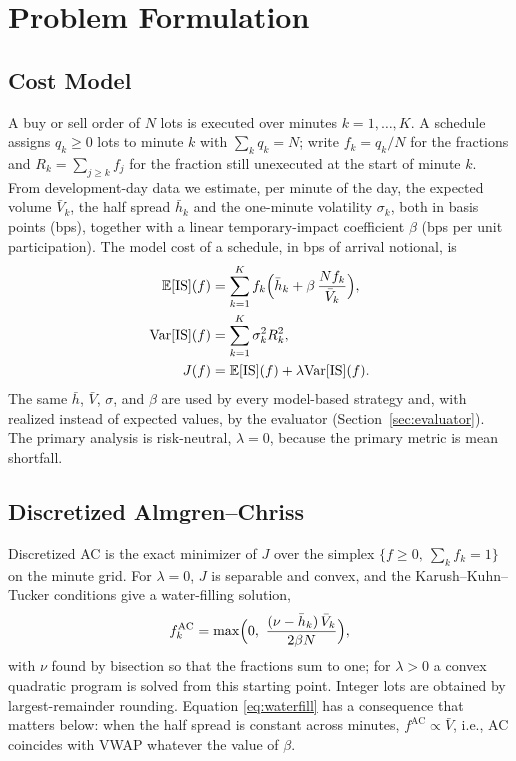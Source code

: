\documentclass[journal]{IEEEtran}
\newcommand{\E}{\mathbb{E}}
\newcommand{\Var}{\mathrm{Var}}
\begin{document}
\section{Problem Formulation}
\label{sec:formulation}

\subsection{Cost Model}
\label{sec:costmodel}

A buy or sell order of $N$ lots is executed over minutes $k=1,\dots,K$. A schedule assigns
$q_k\ge 0$ lots to minute $k$ with $\sum_k q_k=N$; write $f_k=q_k/N$ for the fractions and
$R_k=\sum_{j\ge k} f_j$ for the fraction still unexecuted at the start of minute $k$. From
development-day data we estimate, per minute of the day, the expected volume $\bar V_k$, the
half spread $\bar h_k$ and the one-minute volatility $\sigma_k$, both in basis points (bps),
together with a linear temporary-impact coefficient $\beta$ (bps per unit participation). The
model cost of a schedule, in bps of arrival notional, is
\begin{align}
\E[\mathrm{IS}](f) &= \sum_{k=1}^{K} f_k\Bigl(\bar h_k + \beta\,\frac{N f_k}{\bar V_k}\Bigr),
\label{eq:mean}\\
\Var[\mathrm{IS}](f) &= \sum_{k=1}^{K} \sigma_k^2 R_k^2, \nonumber\\
J(f) &= \E[\mathrm{IS}](f) + \lambda \Var[\mathrm{IS}](f). \label{eq:objective}
\end{align}
The same $\bar h$, $\bar V$, $\sigma$, and $\beta$ are used by every model-based strategy and,
with realized instead of expected values, by the evaluator (Section~\ref{sec:evaluator}).
The primary analysis is risk-neutral, $\lambda=0$, because the primary metric is mean
shortfall.

\subsection{Discretized Almgren--Chriss}
\label{sec:ac}

Discretized AC is the exact minimizer of $J$ over the simplex
$\{f\ge 0,\ \sum_k f_k = 1\}$ on the minute grid. For $\lambda=0$, $J$ is separable and
convex, and the Karush--Kuhn--Tucker conditions give a water-filling solution,
\begin{equation}
f_k^{\mathrm{AC}} = \max\Bigl(0,\ \frac{(\nu-\bar h_k)\,\bar V_k}{2\beta N}\Bigr),
\label{eq:waterfill}
\end{equation}
with $\nu$ found by bisection so that the fractions sum to one; for $\lambda>0$ a convex
quadratic program is solved from this starting point. Integer lots are obtained by
largest-remainder rounding. Equation \eqref{eq:waterfill} has a consequence that matters
below: when the half spread is constant across minutes, $f^{\mathrm{AC}}\propto\bar V$,
i.e., AC coincides with VWAP whatever the value of $\beta$.
\end{document}
